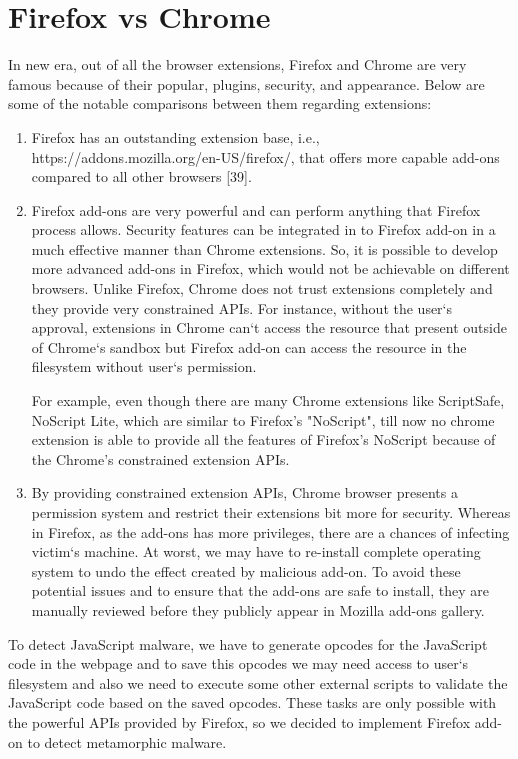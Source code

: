 \section{Firefox vs Chrome} 

In new era, out of all the browser extensions, Firefox and Chrome are very famous because of their popular, plugins, security, and appearance. Below are some of the notable comparisons between them regarding extensions: 
\begin{enumerate}
\item Firefox has an outstanding extension base, i.e., https://addons.mozilla.org/en-US/firefox/, that offers more capable add-ons compared to all other browsers [39]. 
\item Firefox add-ons are very powerful and can perform anything that Firefox process allows. Security features can be integrated in to Firefox add-on in a much effective manner than Chrome extensions. So, it is possible to develop more advanced add-ons in Firefox, which would not be achievable on different browsers. Unlike Firefox, Chrome does not trust extensions completely and they provide very constrained APIs. For instance, without the user`s approval, extensions in Chrome can`t access the resource that present outside of Chrome`s sandbox but Firefox add-on can access the resource in the filesystem without user`s permission. 

For example, even though there are many Chrome extensions like ScriptSafe, NoScript Lite, which are similar to Firefox's "NoScript", till now no chrome extension is able to provide all the features of Firefox's NoScript because of the Chrome's constrained extension APIs.
\item By providing constrained extension APIs, Chrome browser presents a permission system and restrict their extensions bit more for security. Whereas in Firefox, as the add-ons has more privileges, there are a chances of infecting victim`s machine. At worst, we may have to re-install complete operating system to undo the effect created by malicious add-on. To avoid these potential issues and to ensure that the add-ons are safe to install, they are manually reviewed before they publicly appear in Mozilla add-ons gallery.
\end{enumerate}

To detect JavaScript malware, we have to generate opcodes for the JavaScript code in the webpage and to save this opcodes we may need access to user`s filesystem and also we need to execute some other external scripts to validate the JavaScript code based on the saved opcodes. These tasks are only possible with the powerful APIs provided by Firefox, so we decided to implement Firefox add-on to detect metamorphic malware.
